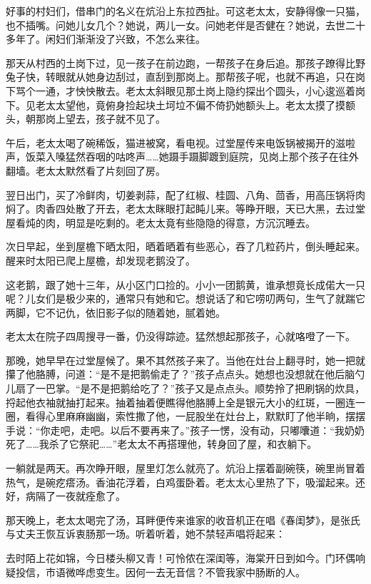 \documentclass{ctexart}
\renewcommand{\\}{\par}
\begin{document}
\\好事的村妇们，借串门的名义在炕沿上东拉西扯。可这老太太，安静得像一只猫，也不插嘴。问她儿女几个？她说，两儿一女。问她老伴是否健在？她说，去世二十多年了。闲妇们渐渐没了兴致，不怎么来往。
\\那天从村西的土岗下过，见一孩子在前边跑，一帮孩子在身后追。那孩子蹽得比野兔子快，转眼就从她身边刮过，直刮到那岗上。那帮孩子呢，也就不再追，只在岗下骂个一通，才怏怏散去。老太太斜眼见那土岗上隐约探出个圆头，小心逡巡着岗下。见老太太望他，竟俯身捡起块土坷垃不偏不倚扔她额头上。老太太摸了摸额头，朝那岗上望去，孩子就不见了。
\\午后，老太太喝了碗稀饭，猫进被窝，看电视。过堂屋传来电饭锅被揭开的滋啦声，饭菜入嗓猛然吞咽的咕咚声……她蹑手蹑脚踱到庭院，见岗上那个孩子在往外翻墙。老太太默然看了片刻回了房。
\\翌日出门，买了冷鲜肉，切姜剥蒜，配了红椒、桂圆、八角、茴香，用高压锅将肉焖了。肉香四处散了开去，老太太眯眼打起盹儿来。等睁开眼，天已大黑，去过堂屋看炖的肉，明显是吃剩的。老太太竟有些隐隐的得意，方沉沉睡去。
\\次日早起，坐到屋檐下晒太阳，晒着晒着有些恶心，吞了几粒药片，倒头睡起来。醒来时太阳已爬上屋檐，却发现老鹅没了。
\\这老鹅，跟了她十三年，从小区门口捡的。小小一团鹅黄，谁承想竟长成偌大一只呢？儿女们是极少来的，通常只有她和它。想说话了和它唠叨两句，生气了就踹它两脚，它不记仇，依旧影子似的随着她，腻着她。
\\老太太在院子四周搜寻一番，仍没得踪迹。猛然想起那孩子，心就咯噔了一下。
\\那晚，她早早在过堂屋候了。果不其然孩子来了。当他在灶台上翻寻时，她一把就攥了他胳膊，问道：“是不是把鹅偷走了？”孩子点点头。她想也没想就在他后脑勺儿扇了一巴掌。“是不是把鹅给吃了？”孩子又是点点头。顺势拎了把刷锅的炊具，捋起他衣袖就抽打起来。抽着抽着便瞧得他胳膊上全是银元大小的红斑，一圈连一圈，看得心里麻麻幽幽，索性撒了他，一屁股坐在灶台上，默默盯了他半晌，摆摆手说：“你走吧，走吧。以后不要再来了。”孩子一愣，没有动，只嘟囔道：“我奶奶死了……我杀了它祭祀……”老太太不再搭理他，转身回了屋，和衣躺下。
\\一躺就是两天。再次睁开眼，屋里灯怎么就亮了。炕沿上摆着副碗筷，碗里尚冒着热气，是碗疙瘩汤。香油花浮着，白鸡蛋卧着。老太太心里热了下，吸溜起来。还好，病隔了一夜就痊愈了。
\\那天晚上，老太太喝完了汤，耳畔便传来谁家的收音机正在唱《春闺梦》，是张氏与丈夫王恢互诉衷肠那一场。听着听着，她不禁轻声唱将起来：
\\去时陌上花如锦，今日楼头柳又青！可怜侬在深闺等，海棠开日到如今。门环偶响疑投信，市语微哗虑变生。因何一去无音信？不管我家中肠断的人。
\end{document}
